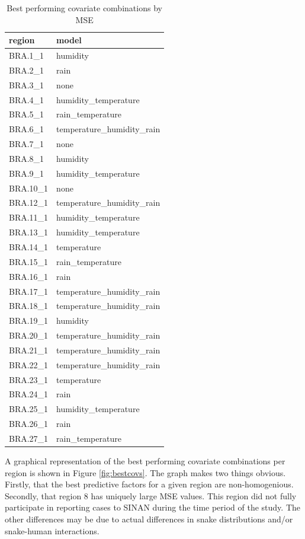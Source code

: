 \documentclass{article}
\begin{document}
\begin{table}
\centering
\caption{Best performing covariate combinations by MSE}
\centering
\begin{tabular}[t]{ll}
\toprule
region & model\\
\midrule
BRA.1\_1 & humidity\\
BRA.2\_1 & rain\\
BRA.3\_1 & none\\
BRA.4\_1 & humidity\_temperature\\
BRA.5\_1 & rain\_temperature\\
\addlinespace
BRA.6\_1 & temperature\_humidity\_rain\\
BRA.7\_1 & none\\
BRA.8\_1 & humidity\\
BRA.9\_1 & humidity\_temperature\\
BRA.10\_1 & none\\
\addlinespace
BRA.12\_1 & temperature\_humidity\_rain\\
BRA.11\_1 & humidity\_temperature\\
BRA.13\_1 & humidity\_temperature\\
BRA.14\_1 & temperature\\
BRA.15\_1 & rain\_temperature\\
\addlinespace
BRA.16\_1 & rain\\
BRA.17\_1 & temperature\_humidity\_rain\\
BRA.18\_1 & temperature\_humidity\_rain\\
BRA.19\_1 & humidity\\
BRA.20\_1 & temperature\_humidity\_rain\\
\addlinespace
BRA.21\_1 & temperature\_humidity\_rain\\
BRA.22\_1 & temperature\_humidity\_rain\\
BRA.23\_1 & temperature\\
BRA.24\_1 & rain\\
BRA.25\_1 & humidity\_temperature\\
\addlinespace
BRA.26\_1 & rain\\
BRA.27\_1 & rain\_temperature\\
\bottomrule
\end{tabular}
\end{table}

A graphical representation of the best performing covariate combinations per region is shown in Figure \ref{fig:bestcovs}. The graph makes two things obvious. Firstly, that the best predictive factors for a given region are non-homogenious. Secondly, that region 8 has uniquely large MSE values. This region did not fully participate in reporting cases to SINAN during the time period of the study. The other differences may be due to actual differences in snake distributions and/or snake-human interactions.
\end{document}
